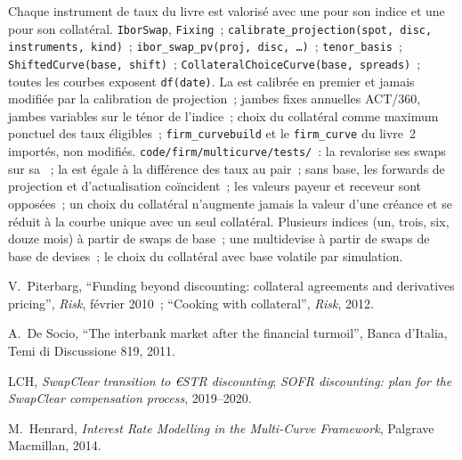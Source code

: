 \begin{build}
 Chaque instrument de taux du livre est valorisé avec une 
pour son indice et une  pour son collatéral.
 \texttt{IborSwap}, \texttt{Fixing}~;
\texttt{calibrate\_projection(spot, disc, instruments, kind)}~;
\texttt{ibor\_swap\_pv(proj, disc, \ldots)}~; \texttt{tenor\_basis}~;
\texttt{ShiftedCurve(base, shift)}~; \texttt{CollateralChoiceCurve(base,
spreads)}~; toutes les courbes exposent \texttt{df(date)}.
 La  est calibrée en premier et jamais modifiée par la
calibration de projection~; jambes fixes annuelles ACT/360, jambes variables sur le
ténor de l'indice~; choix du collatéral comme maximum ponctuel des taux éligibles~;
\texttt{firm\_curvebuild} et le \texttt{firm\_curve} du livre~2 importés, non modifiés.
 \texttt{code/firm/multicurve/tests/}~: la 
revalorise ses swaps sur sa ~; la  est égale à la
différence des taux au pair~; sans base, les forwards de projection et d'actualisation coïncident~;
les valeurs payeur et receveur sont opposées~; un choix du collatéral n'augmente jamais la
valeur d'une créance et se réduit à la courbe unique avec un seul collatéral.
 Plusieurs indices (un, trois, six, douze mois) à partir de swaps
de base~; une  multidevise à partir de swaps de base de devises~; le
choix du collatéral avec base volatile par simulation.
\end{build}

\begin{omsources}
\item V.\ Piterbarg, ``Funding beyond discounting: collateral agreements and
derivatives pricing'', \emph{Risk}, février 2010~; ``Cooking with collateral'',
\emph{Risk}, 2012.
\item A.\ De Socio, ``The interbank market after the financial turmoil'', Banca
d'Italia, Temi di Discussione 819, 2011.
\item LCH, \emph{SwapClear transition to €STR discounting}; \emph{SOFR
discounting: plan for the SwapClear compensation process}, 2019--2020.
\item M.\ Henrard, \emph{Interest Rate Modelling in the Multi-Curve Framework},
Palgrave Macmillan, 2014.
\end{omsources}

